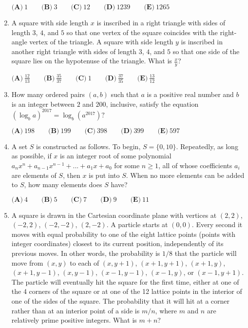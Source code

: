\documentclass{article}
\begin{document}
\begin{enumerate}[label=\arabic*., itemsep=0.5em]
\(\textbf{(A)}\ 1 \qquad\textbf{(B)}\ 3\qquad\textbf{(C)}\ 12\qquad\textbf{(D)}\ 1239\qquad\textbf{(E)}\ 1265\)\par \vspace{0.5em}\item A square with side length \(x\) is inscribed in a right triangle with sides of length \(3\), \(4\), and \(5\) so that one vertex of the square coincides with the right-angle vertex of the triangle. A square with side length \(y\) is inscribed in another right triangle with sides of length \(3\), \(4\), and \(5\) so that one side of the square lies on the hypotenuse of the triangle. What is \(\tfrac{x}{y}\)?

\(\textbf{(A)}\ \frac{12}{13} \qquad \textbf{(B)}\ \frac{35}{37} \qquad\textbf{(C)}\ 1 \qquad\textbf{(D)}\ \frac{37}{35} \qquad\textbf{(E)}\ \frac{13}{12}\)\par \vspace{0.5em}\item How many ordered pairs \((a,b)\) such that \(a\) is a positive real number and \(b\) is an integer between \(2\) and \(200\), inclusive, satisfy the equation \((\log_b a)^{2017}=\log_b(a^{2017})?\)

\(\textbf{(A)}\ 198\qquad\textbf{(B)}\ 199\qquad\textbf{(C)}\ 398\qquad\textbf{(D)}\ 399\qquad\textbf{(E)}\ 597\)\par \vspace{0.5em}\item A set \(S\) is constructed as follows. To begin, \(S = \{0,10\}\). Repeatedly, as long as possible, if \(x\) is an integer root of some polynomial \(a_{n}x^n + a_{n-1}x^{n-1} + ... + a_{1}x + a_0\) for some \(n\geq{1}\), all of whose coefficients \(a_i\) are elements of \(S\), then \(x\) is put into \(S\). When no more elements can be added to \(S\), how many elements does \(S\) have?

\(\textbf{(A)}\ 4 \qquad \textbf{(B)}\ 5 \qquad\textbf{(C)}\ 7 \qquad\textbf{(D)}\ 9 \qquad\textbf{(E)}\ 11\)\par \vspace{0.5em}\item A square is drawn in the Cartesian coordinate plane with vertices at \((2, 2)\), \((-2, 2)\), \((-2, -2)\), \((2, -2)\). A particle starts at \((0,0)\). Every second it moves with equal probability to one of the eight lattice points (points with integer coordinates) closest to its current position, independently of its previous moves. In other words, the probability is \(1/8\) that the particle will move from \((x, y)\) to each of \((x, y + 1)\), \((x + 1, y + 1)\), \((x + 1, y)\), \((x + 1, y - 1)\), \((x, y - 1)\), \((x - 1, y - 1)\), \((x - 1, y)\), or \((x - 1, y + 1)\). The particle will eventually hit the square for the first time, either at one of the 4 corners of the square or at one of the 12 lattice points in the interior of one of the sides of the square. The probability that it will hit at a corner rather than at an interior point of a side is \(m/n\), where \(m\) and \(n\) are relatively prime positive integers. What is \(m + n\)?


\end{enumerate}
\end{document}
